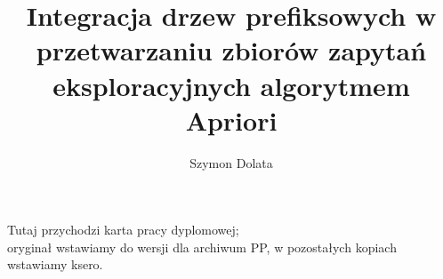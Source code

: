 \documentclass[polish,a4paper,twoside]{ppfcmthesis}
\author{Szymon Dolata}                              %
\title{Integracja drzew prefiksowych w przetwarzaniu zbiorów zapytań eksploracyjnych algorytmem Apriori}        %
\begin{document}
\frontmatter\pagestyle{empty}%
\maketitle\cleardoublepage%

\pagebreak

\thispagestyle{empty}\vspace*{\fill}%
\begin{center}Tutaj przychodzi karta pracy dyplomowej;\\oryginał wstawiamy do wersji dla archiwum PP, w pozostałych kopiach wstawiamy ksero.\end{center}%
\vfill\cleardoublepage%

\pagebreak

\pagestyle{ppfcmthesis}%
\begingroup 
\renewcommand{\vspace}[2]{}%
\tableofcontents* 
\endgroup
\cleardoublepage%

\mainmatter%







\cleardoublepage\appendix%

{\raggedright\sloppy\small}

\ppcolophon
\end{document}

